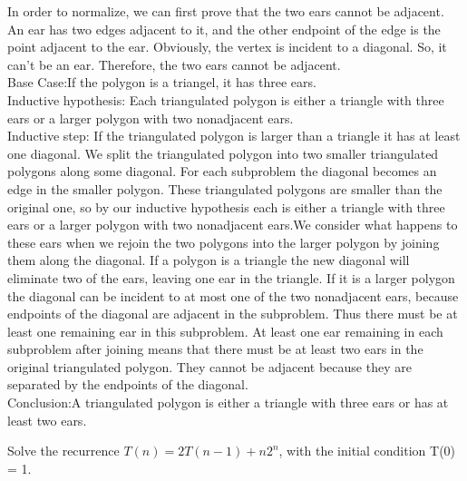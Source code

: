 \documentclass[a4paper, justified]{tufte-handout}
\begin{document}
\begin{solution}
  In order to normalize, we can first prove that the two ears cannot be adjacent.\\
  An ear has two edges adjacent to it, and the other endpoint of the edge is the point adjacent to the ear. Obviously, the vertex is incident to a diagonal. So, it can't be an ear. Therefore, the two ears cannot be adjacent.\\
  Base Case:If the polygon is a triangel, it has three ears.\\
  Inductive hypothesis: Each triangulated polygon is either a triangle with three ears or a larger polygon with two nonadjacent ears.\\
  Inductive step: If the triangulated polygon is larger than a triangle it has at least one diagonal. We split the triangulated polygon into two smaller triangulated polygons along some diagonal. For each subproblem the diagonal becomes an edge in the smaller polygon. These triangulated polygons are smaller than the original one, so by our inductive hypothesis each is either a triangle with three ears or a larger polygon with two nonadjacent ears.We consider what happens to these ears when we rejoin the two polygons into the larger polygon by joining them along the diagonal. If a polygon is a triangle the new diagonal will eliminate two of the ears, leaving one ear in the triangle. If it is a larger polygon the diagonal can be incident to at most one of the two nonadjacent ears, because endpoints of the diagonal are adjacent in the subproblem. Thus there must be at least one remaining ear in this subproblem. At least one ear remaining in each subproblem after joining means that there must be at least two ears in the original triangulated polygon. They cannot be adjacent because they are separated by the endpoints of the diagonal.\\

  Conclusion:A triangulated polygon is either a triangle with three ears or has at least two ears.

\end{solution}

\begin{problem}[CS 4.2-11]
Solve the recurrence $T(n) = 2T(n - 1) + n2^n$, with the initial
condition T(0) = 1.
\end{problem}
\end{document}
